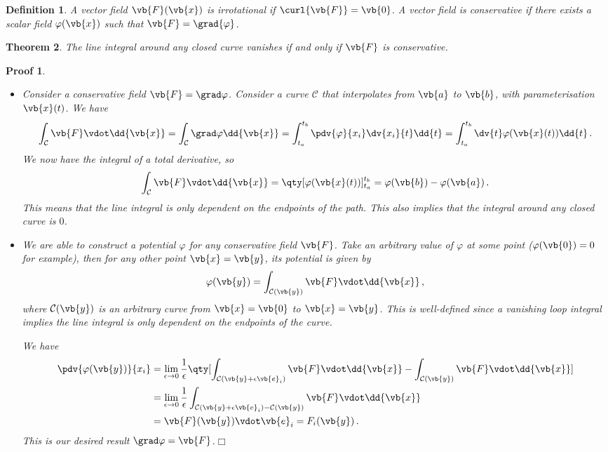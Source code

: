 \documentclass{article}
\theoremstyle{plain}\theoremheaderfont{\normalfont\itshape}\theorembodyfont{\rmfamily}\theoremseparator{.}\newtheorem*{rem}{Remark}\newtheorem*{ex}{Example}\newtheorem*{proof}{Proof}\newtheorem*{altp}{Alternative proof}
\theoremstyle{plain}\theoremheaderfont{\normalfont\bfseries}\theorembodyfont{\rmfamily}\theoremseparator{.}\newtheorem{thm}{Theorem}[section]\newtheorem{lem}[thm]{Lemma}\newtheorem{prop}[thm]{Proposition}\newtheorem*{cor}{Corollary}\newtheorem{defn}[thm]{Definition}\newtheorem{clm}[thm]{Claim}\newtheorem{clminproof}{Claim}
\theoremstyle{break}\theoremheaderfont{\normalfont\itshape}\theorembodyfont{\rmfamily}\theoremseparator{.\medskip}\newtheorem*{proofskip}{Proof}\newtheorem*{exs}{Examples}\newtheorem*{rems}{Remarks}
\theoremstyle{break}\theoremheaderfont{\normalfont\bfseries}\theorembodyfont{\rmfamily}\theoremseparator{.\medskip}\newtheorem{lemskip}[thm]{Lemma}\newtheorem{defnskip}[thm]{Definition}\newtheorem{propskip}[thm]{Proposition}\newtheorem{thmskip}[thm]{Theorem}
\numberwithin{equation}{section}
\newcommand{\qed}{\hfill\ensuremath{\Box}}
\begin{document}
	\begin{defn}
		A vector field \(\vb{F}(\vb{x})\) is \textit{irrotational} if \(\curl{\vb{F}}=\vb{0}\). A vector field is \textit{conservative} if there exists a scalar field \(\varphi(\vb{x})\) such that \(\vb{F}=\grad{\varphi}\).
	\end{defn}
	\begin{thm}\label{confield}
		The line integral around any closed curve vanishes if and only if \(\vb{F}\) is conservative.
	\end{thm}
	\begin{proofskip}
		\begin{itemize}
			\item[(\(\Leftarrow\))] Consider a conservative field \(\vb{F}=\grad\varphi\). Consider a curve \(\mathcal{C}\) that interpolates from \(\vb{a}\) to \(\vb{b}\), with parameterisation \(\vb{x}(t)\). We have
			\[\int_\mathcal{C}\vb{F}\vdot\dd{\vb{x}}=\int_\mathcal{C}\grad\varphi\dd{\vb{x}}=\int_{t_a}^{t_b}\pdv{\varphi}{x_i}\dv{x_i}{t}\dd{t}=\int_{t_a}^{t_b}\dv{t}\varphi(\vb{x}(t))\dd{t}\,.\]
			We now have the integral of a total derivative, so
			\[\int_\mathcal{C}\vb{F}\vdot\dd{\vb{x}}=\qty[\varphi(\vb{x}(t))]_{t_a}^{t_b}=\varphi(\vb{b})-\varphi(\vb{a})\,.\]
			This means that the line integral is only dependent on the endpoints of the path. This also implies that the integral around any closed curve is \(0\).
			\item[(\(\Rightarrow\))] We are able to construct a potential \(\varphi\) for any conservative field \(\vb{F}\). Take an arbitrary value of \(\varphi\) at some point (\(\varphi(\vb{0})=0\) for example), then for any other point \(\vb{x}=\vb{y}\), its potential is given by
			\[\varphi(\vb{y})=\int_{\mathcal{C}(\vb{y})} \vb{F}\vdot\dd{\vb{x}}\,,\]
			where \(\mathcal{C}(\vb{y})\) is an arbitrary curve from \(\vb{x}=\vb{0}\) to \(\vb{x}=\vb{y}\). This is well-defined since a vanishing loop integral implies the line integral is only dependent on the endpoints of the curve.

			We have
			\begin{align*}
				\pdv{\varphi(\vb{y})}{x_i}&=\lim_{\epsilon\to 0}\frac{1}{\epsilon}\qty[\int_{\mathcal{C}(\vb{y}+\epsilon\vb{e}_i)}\vb{F}\vdot\dd{\vb{x}}-\int_{\mathcal{C}(\vb{y})}\vb{F}\vdot\dd{\vb{x}}]\\
				&=\lim_{\epsilon\to 0}\frac{1}{\epsilon}\int_{\mathcal{C}(\vb{y}+\epsilon\vb{e}_i)-\mathcal{C}(\vb{y})}\vb{F}\vdot\dd{\vb{x}}\\
				&=\vb{F}(\vb{y})\vdot\vb{e}_i=F_i(\vb{y})\,.
			\end{align*}
			This is our desired result \(\grad\varphi=\vb{F}\).\qed
		\end{itemize}
	\end{proofskip}
\end{document}
